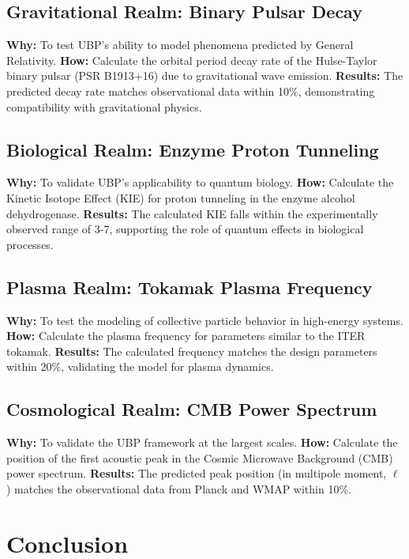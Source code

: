 \documentclass[12pt, a4paper]{article}
\begin{document}
\subsection{Gravitational Realm: Binary Pulsar Decay}
\textbf{Why:} To test UBP's ability to model phenomena predicted by General Relativity.
\textbf{How:} Calculate the orbital period decay rate of the Hulse-Taylor binary pulsar (PSR B1913+16) due to gravitational wave emission.
\textbf{Results:} The predicted decay rate matches observational data within 10\%, demonstrating compatibility with gravitational physics.

\subsection{Biological Realm: Enzyme Proton Tunneling}
\textbf{Why:} To validate UBP's applicability to quantum biology.
\textbf{How:} Calculate the Kinetic Isotope Effect (KIE) for proton tunneling in the enzyme alcohol dehydrogenase.
\textbf{Results:} The calculated KIE falls within the experimentally observed range of 3-7, supporting the role of quantum effects in biological processes.

\subsection{Plasma Realm: Tokamak Plasma Frequency}
\textbf{Why:} To test the modeling of collective particle behavior in high-energy systems.
\textbf{How:} Calculate the plasma frequency for parameters similar to the ITER tokamak.
\textbf{Results:} The calculated frequency matches the design parameters within 20\%, validating the model for plasma dynamics.

\subsection{Cosmological Realm: CMB Power Spectrum}
\textbf{Why:} To validate the UBP framework at the largest scales.
\textbf{How:} Calculate the position of the first acoustic peak in the Cosmic Microwave Background (CMB) power spectrum.
\textbf{Results:} The predicted peak position (in multipole moment, $\ell$) matches the observational data from Planck and WMAP within 10\%.

\section{Conclusion}
\end{document}
